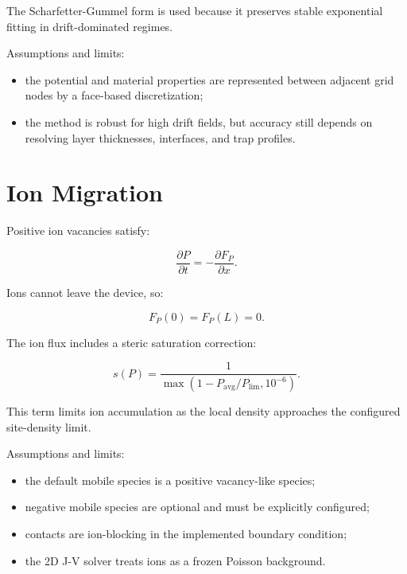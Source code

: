 \documentclass[
  11pt,
  american,
]{report}
\providecommand{\tightlist}{%
  \setlength{\itemsep}{0pt}\setlength{\parskip}{0pt}}
\begin{document}
The Scharfetter-Gummel form is used because it preserves stable
exponential fitting in drift-dominated regimes.

Assumptions and limits:

\begin{itemize}
\tightlist
\item
  the potential and material properties are represented between adjacent
  grid nodes by a face-based discretization;
\item
  the method is robust for high drift fields, but accuracy still depends
  on resolving layer thicknesses, interfaces, and trap profiles.
\end{itemize}

\hypertarget{ion-migration}{%
\section{Ion Migration}\label{ion-migration}}

Positive ion vacancies satisfy:

\begin{equation}
\label{eq:ion-continuity}
\frac{\partial P}{\partial t}
=
-\frac{\partial F_P}{\partial x}.
\end{equation}

Ions cannot leave the device, so:

\begin{equation}
\label{eq:ion-zero-flux}
F_P(0)=F_P(L)=0.
\end{equation}

The ion flux includes a steric saturation correction:

\begin{equation}
\label{eq:steric}
s(P)
=
\frac{1}
{\max(1-P_\mathrm{avg}/P_\mathrm{lim},10^{-6})}.
\end{equation}

This term limits ion accumulation as the local density approaches the
configured site-density limit.

Assumptions and limits:

\begin{itemize}
\tightlist
\item
  the default mobile species is a positive vacancy-like species;
\item
  negative mobile species are optional and must be explicitly
  configured;
\item
  contacts are ion-blocking in the implemented boundary condition;
\item
  the 2D J-V solver treats ions as a frozen Poisson background.
\end{itemize}
\end{document}
